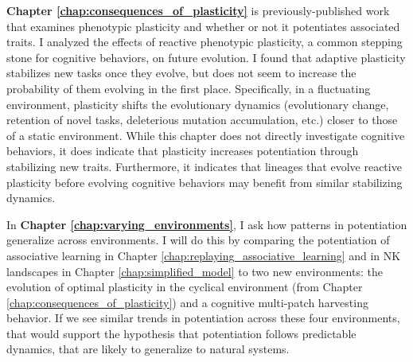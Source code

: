\textbf{Chapter \ref{chap:consequences_of_plasticity}} is previously-published work that examines phenotypic plasticity and whether or not it potentiates associated traits.
I analyzed the effects of reactive phenotypic plasticity, a common stepping stone for cognitive behaviors, on future evolution. 
I found that adaptive plasticity stabilizes new tasks once they evolve, but does not seem to increase the probability of them evolving in the first place. %
Specifically, in a fluctuating environment, plasticity shifts the evolutionary dynamics (evolutionary change, retention of novel tasks, deleterious mutation accumulation, etc.) closer to those of a static environment. 
While this chapter does not directly investigate cognitive behaviors, it does indicate that plasticity increases potentiation through stabilizing new traits.
Furthermore, it indicates that lineages that evolve reactive plasticity before evolving cognitive behaviors may benefit from similar stabilizing dynamics.

In \textbf{Chapter \ref{chap:varying_environments}}, I ask how patterns in potentiation generalize across environments.
I will do this by comparing the potentiation of associative learning in Chapter \ref{chap:replaying_associative_learning} and in NK landscapes in Chapter \ref{chap:simplified_model} to two new environments: the evolution of optimal plasticity in the cyclical environment (from Chapter \ref{chap:consequences_of_plasticity}) and a cognitive multi-patch harvesting behavior. 
If we see similar trends in potentiation across these four environments, that would support the hypothesis that potentiation follows predictable dynamics, that are likely to generalize to natural systems. %


